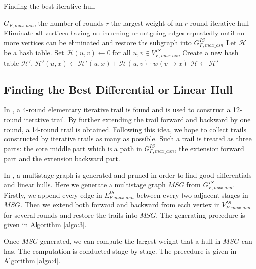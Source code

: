 \begin{algorithm}
	\caption{Finding the best iterative hull}
	\label{algo:2}
	\begin{algorithmic}[1]
		\Require $G_{F,max\_asn}$, the number of rounds $r$
		\Ensure the largest weight of an $r$-round iterative hull
		\Procedure {}{}
		\State Eliminate all vertices having no incoming or outgoing edges repeatedly until no more vertices can be eliminated and restore the subgraph into $G^{IS}_{F,max\_asn}$
		\State Let $\mathcal{H}$ be a hash table. Set $\mathcal{H}(u,v)\leftarrow 0$ for all $u,v\in V^{IS}_{F,max\_asn}$
		\State Create a new hash table $\mathcal{H}'$. 
		\State $\mathcal{H}'(u,x)\leftarrow \mathcal{H}'(u,x)+\mathcal{H}(u,v)\cdot w(v\rightarrow x)$
		\EndFor
		\EndFor
		\State $\mathcal{H}\leftarrow \mathcal{H}'$
		\EndFor
		\State {}
		\EndProcedure
	\end{algorithmic}
\end{algorithm}

\subsection{Finding the Best Differential or Linear Hull}\label{sec:fbh}

In \cite{W08}, a 4-round elementary iterative trail is found and is used to construct a 12-round iterative trail. By further extending the trail forward and backward by one round, a 14-round trail is obtained. Following this idea, we hope to collect trails constructed by iterative trails as many as possible. Such a trail is treated as three parts: the core middle part which is a path in $G^{IS}_{F,max\_asn}$, the extension forward part and the extension backward part. 

In \cite{HV18}, a multistage graph is generated and pruned in order to find good differentials and linear hulls. Here we generate a multistage graph $MSG$ from $G^{IS}_{F,max\_asn}$. Firstly, we append every edge in $E^{IS}_{F,max\_asn}$ between every two adjacent stages in $MSG$. Then we extend both forward and backward from each vertex in $V^{IS}_{F,max\_asn}$ for several rounds and restore the trails into $MSG$. The generating procedure is given in Algorithm \ref{algo:3}. 

Once $MSG$ generated, we can compute the largest weight that a hull in $MSG$ can has. The computation is conducted stage by stage. The procedure is given in Algorithm \ref{algo:4}.

